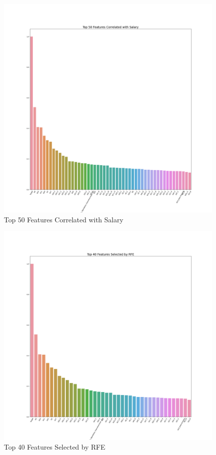 \documentclass[10pt,onecolumn,letterpaper]{article}
\begin{document}
\begin{figure}[htbp]
  \centering
  \includegraphics[width=.75\textwidth]{f3.png}
  \caption{Top 50 Features Correlated with Salary}
\end{figure}

\begin{figure}[htbp]
  \centering
  \includegraphics[width=.75\textwidth]{f4.png}
  \caption{Top 40 Features Selected by RFE}
\end{figure}
\end{document}
